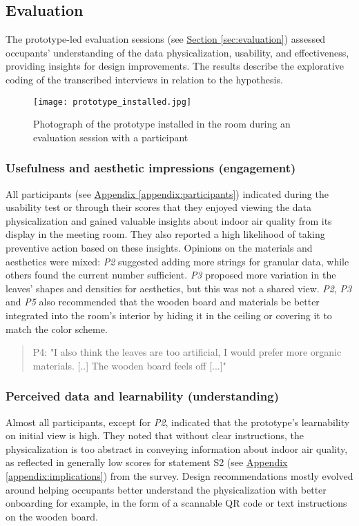 \subsection{Evaluation}
\label{sec:evaluation_results}

The prototype-led evaluation sessions (see \hyperref[sec:evaluation]{Section \ref*{sec:evaluation}}) assessed occupants' understanding of the data physicalization, usability, and effectiveness, providing insights for design improvements. The results describe the explorative coding of the transcribed interviews in relation to the hypothesis.


\begin{figure}[b]
    \centering
    \texttt{[image: prototype\_installed.jpg]}
    \caption{Photograph of the prototype installed in the room during an evaluation session with a participant }
    \label{fig:photograph-prototype}
\end{figure}

\subsubsection{Usefulness and aesthetic impressions (engagement)}

All participants (see \hyperref[appendix:participants]{Appendix \ref*{appendix:participants}}) indicated during the usability test or through their scores that they enjoyed viewing the data physicalization and gained valuable insights about indoor air quality from its display in the meeting room. They also reported a high likelihood of taking preventive action based on these insights. Opinions on the materials and aesthetics were mixed: \textit{P2} suggested adding more strings for granular data, while others found the current number sufficient. \textit{P3} proposed more variation in the leaves' shapes and densities for aesthetics, but this was not a shared view. \textit{P2}, \textit{P3} and \textit{P5} also recommended that the wooden board and materials be better integrated into the room’s interior by hiding it in the ceiling or covering it to match the color scheme.

\begin{quote}
P4: "I also think the leaves are too artificial, I would prefer more organic materials. [..] The wooden board feels off [...]"
\end{quote}

\subsubsection{Perceived data and learnability (understanding)}
Almost all participants, except for \textit{P2}, indicated that the prototype's learnability on initial view is high. They noted that without clear instructions, the physicalization is too abstract in conveying information about indoor air quality, as reflected in generally low scores for statement S2 (see \hyperref[appendix:implications]{Appendix \ref*{appendix:implications}}) from the survey. Design recommendations mostly evolved around helping occupants better understand the physicalization with better onboarding for example, in the form of a scannable QR code or text instructions on the wooden board.

